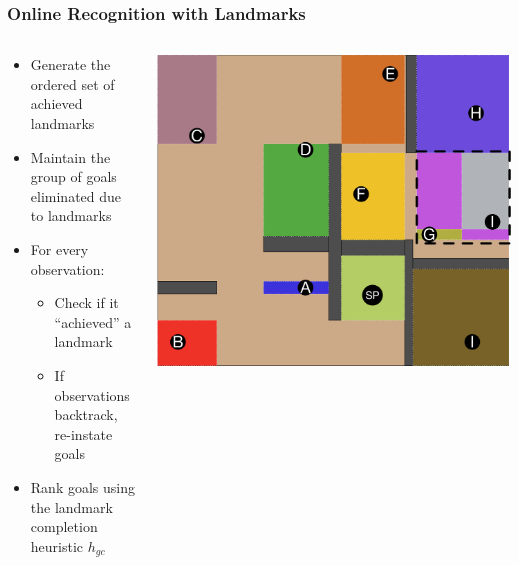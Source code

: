 \documentclass{beamer}
\begin{document}
	\begin{frame}[c]\frametitle{Online Recognition with Landmarks}
		\begin{columns}
			\begin{column}{0.7\textwidth}
			\begin{itemize}
				\item Generate the ordered set of achieved landmarks
				\item Maintain the group of goals eliminated due to landmarks
				\item For every observation:
				\begin{itemize}
					\item Check if it ``achieved'' a landmark
					\item If observations backtrack, re-instate goals
				\end{itemize}
				\item Rank goals using the landmark completion heuristic $h_{gc}$
			\end{itemize}
			\end{column}
			\begin{column}{0.3\textwidth}
				\includegraphics[width=\textwidth]{fig/continuous-landmark-example.pdf}
			\end{column}
		\end{columns}
	\end{frame}
	
\end{document}
